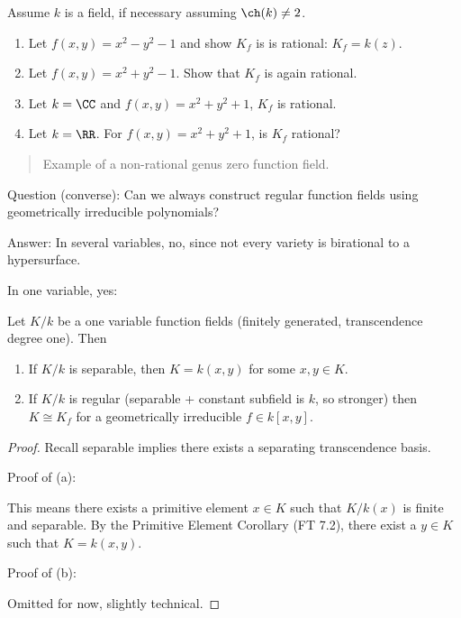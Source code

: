 \begin{exercise}

Assume \(k\) is a field, if necessary assuming \(\ch(k) \neq 2\).

\begin{enumerate}
\def\labelenumi{\alph{enumi}.}
\item
  Let \(f(x, y) = x^2 - y^2 -1\) and show \(K_f\) is is rational:
  \(K_f = k(z)\).
\item
  Let \(f(x, y) = x^2 + y^2 - 1\). Show that \(K_f\) is again rational.
\item
  Let \(k = \CC\) and \(f(x, y) = x^2 + y^2 + 1\), \(K_f\) is rational.
\item
  Let \(k= \RR\). For \(f(x ,y) = x^2 + y^2 + 1\), is \(K_f\) rational?
\end{enumerate}

\begin{quote}
Example of a non-rational genus zero function field.
\end{quote}

\end{exercise}

Question (converse): Can we always construct regular function fields
using geometrically irreducible polynomials?

Answer: In several variables, no, since not every variety is birational
to a hypersurface.

In one variable, yes:

\begin{theorem}

Let \(K/k\) be a one variable function fields (finitely generated,
transcendence degree one). Then

\begin{enumerate}
\def\labelenumi{\alph{enumi}.}
\item
  If \(K/k\) is separable, then \(K = k(x, y)\) for some \(x, y\in K\).
\item
  If \(K/k\) is regular (separable + constant subfield is \(k\), so
  stronger) then \(K \cong K_f\) for a geometrically irreducible
  \(f\in k[x ,y]\).
\end{enumerate}

\end{theorem}

\begin{proof}

Recall separable implies there exists a separating transcendence basis.

Proof of (a):

This means there exists a primitive element \(x\in K\) such that
\(K/k(x)\) is finite and separable. By the Primitive Element Corollary
(FT 7.2), there exist a \(y\in K\) such that \(K = k(x, y)\).

Proof of (b):

Omitted for now, slightly technical.

\end{proof}

